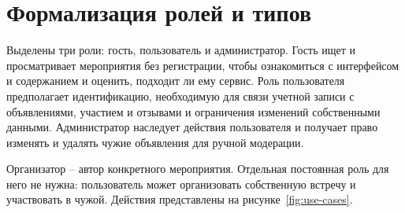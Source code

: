 \clearpage
\section{Формализация ролей и типов}

Выделены три роли: гость, пользователь и администратор. Гость ищет и просматривает мероприятия без регистрации, чтобы ознакомиться с интерфейсом и содержанием и оценить, подходит ли ему сервис. Роль пользователя предполагает идентификацию, необходимую для связи учетной записи с объявлениями, участием и отзывами и ограничения изменений собственными данными. Администратор наследует действия пользователя и получает право изменять и удалять чужие объявления для ручной модерации.

Организатор -- автор конкретного мероприятия. Отдельная постоянная роль для него не нужна: пользователь может организовать собственную встречу и участвовать в чужой. Действия представлены на рисунке~\ref{fig:use-cases}.

